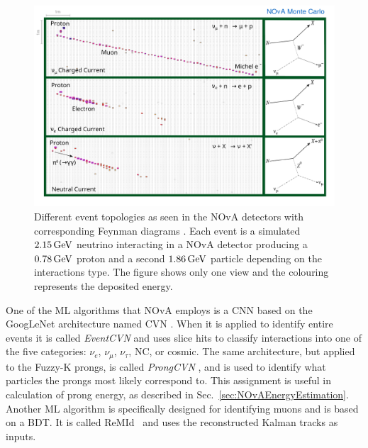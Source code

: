 \begin{figure}[ht]
\centering
\includegraphics[width=1\textwidth]{Plots/NOvAExperiment/NOvAEventTopology.pdf}
\caption[NOvA detectors event topologies]{Different event topologies as seen in the \acrshort{NOvA} detectors with corresponding Feynman diagrams \cite{NOvAReco.pdf}. Each event is a simulated $\unit[2.15]{GeV}$ neutrino interacting in a \acrshort{NOvA} detector producing a $\unit[0.78]{GeV}$ proton and a second $\unit[1.86]{GeV}$ particle depending on the interactions type. The figure shows only one view and the colouring represents the deposited energy.}
\label{fig:NOvAEventTopologies}
\end{figure}

One of the \gls{ML} algorithms that NOvA employs is a \gls{CNN} based on the GoogLeNet \cite{GoogLeNetArchitecture.pdf} architecture named \gls{CVN} \cite{CVN.pdf}. When it is applied to identify entire events it is called \textit{EventCVN} and uses slice hits to classify interactions into one of the five categories: $\nu_e$, $\nu_\mu$, $\nu_\tau$, \gls{NC}, or cosmic. The same architecture, but applied to the Fuzzy-K prongs, is called \textit{ProngCVN} \cite{PsihasNOvAThesis_ProngCVN.pdf}, and is used to identify what particles the prongs most likely correspond to. This assignment is useful in calculation of prong energy, as described in Sec.~\ref{sec:NOvAEnergyEstimation}. Another \gls{ML} algorithm is specifically designed for identifying muons and is based on a \gls{BDT}. It is called \gls{ReMId}~\cite{RaddatzNOvAThesis_KalmanTracks.pdf} and uses the reconstructed Kalman tracks as inputs.


